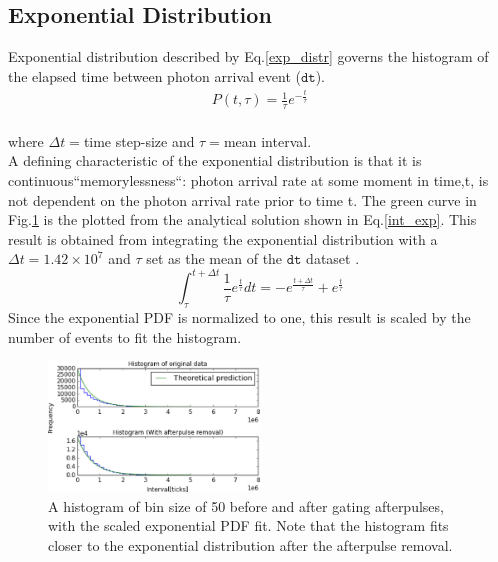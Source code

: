 \documentclass[authoryear, 12pt,5p, times]{elsarticle}
\begin{document}
 	\subsection{Exponential Distribution}
 	Exponential distribution described by Eq.\ref{exp_distr} governs the histogram of the elapsed time between photon arrival event ($\texttt{dt}$).
\begin{align} 
P(t,\tau)=\frac{1}{\tau}e^{-\frac{t}{\tau}}
\end{align}
\\where  $\Delta t= $time step-size and  $\tau=$mean interval.
\\  A defining characteristic of the exponential distribution is that it is continuous``memorylessness``: photon arrival rate at some moment in time,t, is not dependent on the photon arrival rate prior to time t.  The green curve in Fig.\ref{fitted_histo_gate_or_no} is the plotted from the analytical solution shown in Eq.\ref{int_exp}. This result is obtained from integrating the exponential distribution with a  $\Delta t =1.42\times10^7$ and $\tau$ set as the mean of the $\texttt{dt}$ dataset .  
 	 \begin{equation}\label{int_exp}
 	 \int^{t+\Delta t}_\tau\frac{1}{\tau}e^\frac{t}{\tau}dt=-e^\frac{t+\Delta t}{\tau}+e^\frac{t}{\tau}
	\end{equation} 	  
Since the exponential PDF is normalized to one, this result is scaled by the number of events to fit the histogram.
 	\begin{figure}[h]
		\includegraphics[width=0.5\textwidth]{figures/histogram}
		\caption{A histogram of bin size of 50 before and after gating afterpulses, with the scaled exponential PDF fit. Note that the histogram fits closer to the exponential distribution after the afterpulse removal.}
		\label{fitted_histo_gate_or_no}
	\end{figure}
\end{document}

